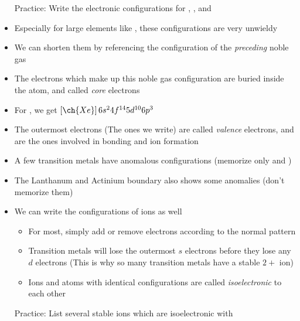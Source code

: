 \documentclass[12pt, openany, letterpaper]{memoir}
\begin{document}
\begin{itemize}
	Practice: Write the electronic configurations for , , and 
	\item Especially for large elements like , these configurations are very unwieldy
	\item We can shorten them by referencing the configuration of the \emph{preceding} noble gas 
	\item The electrons which make up this noble gas configuration are buried inside the atom, and called \emph{core} electrons
	\item For , we get $\left[\ch{Xe}\right]6s^24f^{14}5d^{10}6p^3$
	\item The outermost electrons (The ones we write) are called \emph{valence} electrons, and are the ones involved in bonding and ion formation
	\item A few transition metals have anomalous configurations (memorize only  and )
	\item The Lanthanum and Actinium boundary also shows some anomalies (don't memorize them)
	\item We can write the configurations of ions as well
	\begin{itemize}
		\item For most, simply add or remove electrons according to the normal pattern
		\item Transition metals will lose the outermost $s$ electrons before they lose any $d$ electrons (This is why so many transition metals have a stable $2+$ ion)
		\item Ions and atoms with identical configurations are called \emph{isoelectronic} to each other		
	\end{itemize}
	Practice: List several stable ions which are isoelectronic with 
\end{itemize}
\end{document}
